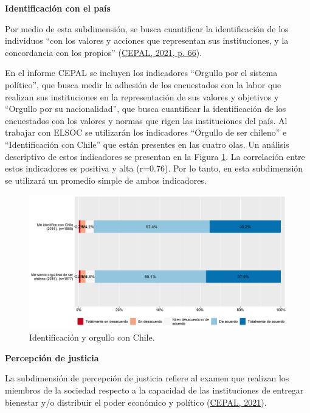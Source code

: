 \documentclass[
  12pt,
]{book}
\begin{document}
\textbf{Identificación con el país}

Por medio de esta subdimensión, se busca cuantificar la identificación de los individuos ``con los valores y acciones que representan sus instituciones, y la concordancia con los propios'' (\protect\hyperlink{ref-cepal_Cohesion_2021}{CEPAL, 2021, p. 66}).

En el informe CEPAL se incluyen los indicadores ``Orgullo por el sistema político'', que busca medir la adhesión de los encuestados con la labor que realizan sus instituciones en la representación de sus valores y objetivos y ``Orgullo por su nacionalidad'', que busca cuantificar la identificación de los encuestados con los valores y normas que rigen las instituciones del país. Al trabajar con ELSOC se utilizarán los indicadores ``Orgullo de ser chileno'' e ``Identificación con Chile'' que están presentes en las cuatro olas. Un análisis descriptivo de estos indicadores se presentan en la Figura \ref{fig:identificacion}. La correlación entre estos indicadores es positiva y alta (r=0.76). Por lo tanto, en esta subdimensión se utilizará un promedio simple de ambos indicadores.

\begin{figure}[H]

{\centering \includegraphics[width=1\linewidth,height=1\textheight]{output/graphs/identificacion} 

}

\caption{Identificación y orgullo con Chile.}\label{fig:identificacion}
\end{figure}

\textbf{Percepción de justicia}

La subdimensión de percepción de justicia refiere al examen que realizan los miembros de la sociedad respecto a la capacidad de las instituciones de entregar bienestar y/o distribuir el poder económico y político (\protect\hyperlink{ref-cepal_Cohesion_2021}{CEPAL, 2021}).
\end{document}
